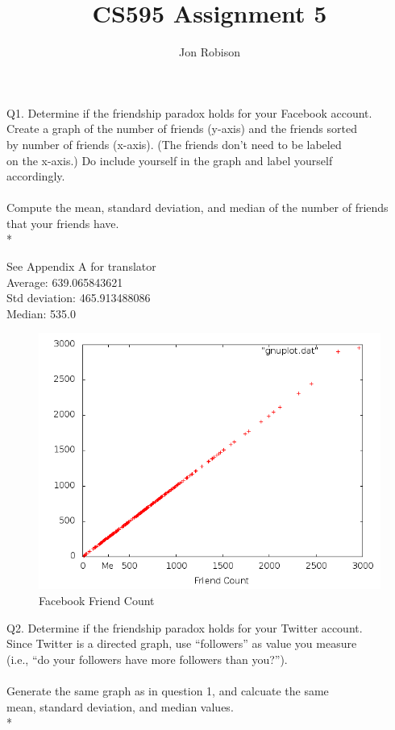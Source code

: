 \documentclass{article}
\begin{document}
\author{Jon Robison}
\title{CS595 Assignment 5}
\maketitle

Q1.  Determine if the friendship paradox holds for your Facebook account.\\
Create a graph of the number of friends (y-axis) and the friends sorted\\
by number of friends (x-axis).  (The friends don't need to be labeled \\
on the x-axis.)  Do include yourself in the graph and label yourself\\
accordingly.\\
\\
Compute the mean, standard deviation, and median of the number of friends\\
that your friends have. \\*

See Appendix A for translator\\
Average: 639.065843621 \\
Std deviation: 465.913488086 \\
Median: 535.0 \\
\graphicspath{{q1/}}
\begin{figure}[H]
  \centering
  \caption{Facebook Friend Count}
  \includegraphics[scale=.45]{scatter.png}
\end{figure}
\clearpage

Q2. Determine if the friendship paradox holds for your Twitter account.\\
Since Twitter is a directed graph, use ``followers'' as value you measure\\
(i.e., ``do your followers have more followers than you?'').\\
\\
Generate the same graph as in question 1, and calcuate the same \\
mean, standard deviation, and median values.\\*
\end{document}
